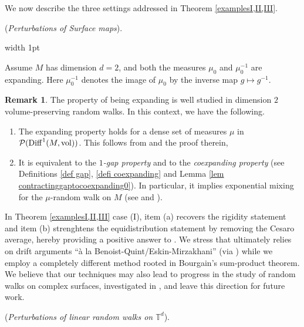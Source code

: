 \documentclass[11pt, leqno, fleqn]{amsart}
\newcommand{\T}{{\mathbb T}}
\newcommand{\cP}{{\mathcal P}}
\theoremstyle{definition}
\newtheorem{rema}[thm]{\bf Remark}
\theoremstyle{definition}
\def \vol{  {\rm vol} }
\newcommand{\Diff}{{\rm Diff}}
\begin{document}
			\bigskip
				
				We now describe the three settings addressed in Theorem \ref{examplesI,II,III}. 
				
	
				\bigskip 
	 		 (\emph{Perturbations of Surface maps}).
			
\noindent
\vrule width 1pt\hspace{0.4em}
\parbox{0.9\linewidth}{
Assume $M$ has dimension $d=2$, and both the measures $\mu_{0}$ and $\mu_{0}^{-1}$ are expanding. Here $\mu_{0}^{-1}$ denotes the image of $\mu_{0}$ by the inverse map $g\mapsto g^{-1}$.  
}

		
\begin{rema}
The property of being expanding  is well studied   in dimension $2$ volume-preserving   random walks.  
In this context, we have the following.
\begin{enumerate}
	\item The expanding property  holds for a dense set of measures $\mu$ in $\cP(\Diff^1(M, \vol))$.  This follows from \cite{P} and the proof therein,
	

	

	
	\item It is equivalent to the \emph{$1$-gap property}  and to the {\it coexpanding  property} (see Definitions \ref{def gap}, \ref{defi coexpanding} and Lemma \ref{lem contractinggaptocoexpanding0}). In particular,  it implies exponential mixing for the $\mu$-random walk on $M$  (see \cite[Theorem 1.1]{DD2} and \cite{DD}). 
	\end{enumerate}
\end{rema}


 In Theorem \ref{examplesI,II,III} case (I), item (a) recovers the rigidity statement  \cite[Thm B]{BLOR2} and item (b) strenghtens the equidistribution statement \cite[Thm C]{BLOR2} by removing the Cesaro average, hereby providing a positive answer to \cite[Question 1.2]{BLOR2}. We stress that \cite{BLOR2} ultimately relies on drift arguments ``\`a la Benoist-Quint/Eskin-Mirzakhani'' (via \cite{BRH})  while we employ a completely different method rooted in Bourgain's sum-product theorem.  We believe that our techniques may also lead to progress in the study of random walks on complex surfaces, investigated in \cite{CD, R}, and leave this direction for future work.
 	\bigskip
	
				
 		 (\emph{Perturbations of linear random walks on $\T^d$}).
		
\end{document}
